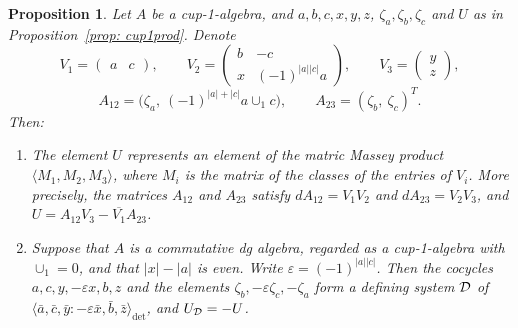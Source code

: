 \documentclass[11pt]{article}
\newtheorem{proposition}[theorem]{Proposition}
\theoremstyle{definition}
\theoremstyle{definition}
\begin{document}
\begin{proposition}
\label{prop: cup1 and det}
Let $A$ be a cup-1-algebra, and $a,b,c,x,y,z$, $\zeta_a,\zeta_b,\zeta_c$ and $U$
as in Proposition~\ref{prop: cup1prod}. Denote
\[
V_1=\begin{pmatrix} a & c\end{pmatrix},\qquad
V_2=\begin{pmatrix} b & -c\\ x & (-1)^{|a||c|}a\end{pmatrix},\qquad
V_3=\begin{pmatrix} y\\ z\end{pmatrix},
\]
\[
A_{12}=\bigl(\zeta_a,\ (-1)^{|a|+|c|}a\cup_1c\bigr),\qquad
A_{23}=(\zeta_b,\ \zeta_c)^T.
\]
Then:
\begin{enumerate}

\item The element $U$ represents an element of the matric Massey product
$\langle M_1,M_2,M_3\rangle$, where $M_i$ is the matrix of the classes
of the entries of $V_i$.
More precisely, 
the matrices $A_{12}$ and $A_{23}$ satisfy $dA_{12}=V_1V_2$ and
$dA_{23}=V_2V_3$, and $U=A_{12}V_3-\overline{V_1}A_{23}$.


\item Suppose that $A$ is a commutative dg algebra, regarded as a
cup-1-algebra with $\cup_1=0$, and that $|x|-|a|$ is even. Write
$\varepsilon=(-1)^{|a||c|}$. Then the cocycles
$a,c,y,-\varepsilon x,b,z$ and the elements
$\zeta_b,-\varepsilon\zeta_c,-\zeta_a$ form a defining system
$\mathcal D$ of
$\langle \bar a,\bar c,\bar y : -\varepsilon\bar x,\bar b,
\bar z\rangle_{\det}$, and $U_{\mathcal D}=-U$.
\end{enumerate}
\end{proposition}
\end{document}
